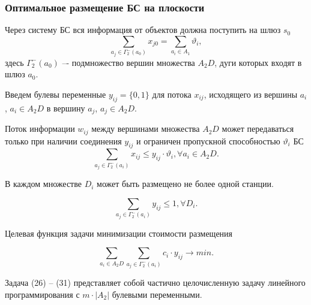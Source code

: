 \begin{frame}
    \frametitle{Оптимальное размещение БС на плоскости}
    \fontsize{8pt}{7.2}\selectfont

    Через систему БС вся информация от объектов  должна поступить на шлюз $s_0$ 
    \begin{equation}\label{eq:part3_device2gateway_flow}
        \sum_{a_j \in \Gamma_2^-(a_0)} x_{j0} = \sum_{a_i \in A_1} \vartheta_i,
    \end{equation}
    здесь $\Gamma_2^-(a_0)$ –- подмножество вершин множества $A_2D$, дуги которых входят в шлюз $a_0$.

    \medskip

    Введем булевы переменные $y_{ij} = \{0,1\}$ для потока $x_{ij}$, исходящего из вершины $a_i$, $a_i \in A_2D$ в вершину $a_j$, $a_j \in A_2D$. 

    Поток информации $w_{ij}$ между вершинами множества $A_2D$ может передаваться только при наличии соединения $y_{ij}$ и ограничен пропускной способностью $\vartheta_i$ БС
    \begin{equation}\label{eq:part3_flow_link_sta}
        \sum_{a_j \in \Gamma_2^-(a_i)} x_{ij} \leqslant y_{ij} \cdot \vartheta_i, \forall a_i \in A_2D.
    \end{equation}

    В каждом множестве $D_i$ может быть размещено не более одной станции. 

    \begin{equation}\label{eq:part3_only_1_link_yij}
        \sum_{a_j \in \Gamma_2^-(a_i)} y_{ij} \leqslant 1, \forall D_i.
    \end{equation}

    Целевая функция задачи минимизации стоимости размещения 

    \begin{equation}\label{eq:part3_of_min}
        \sum_{a_i \in A_2D} \sum_{a_j \in \Gamma_2^-(a_i)}c_i \cdot y_{ij} \to min.
    \end{equation}

    Задача (26) -- (31)   представляет собой частично целочисленную задачу линейного программирования с $m \cdot |A_2|$ булевыми переменными. 

\end{frame}


